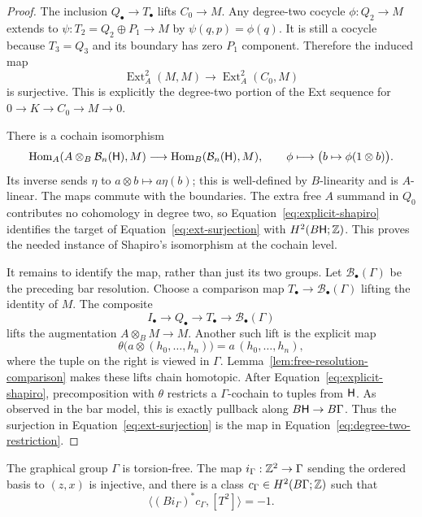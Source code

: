 \begin{proof}
The inclusion $Q_\bullet\to T_\bullet$ lifts $C_0\to M$.
Any degree-two cocycle $\phi:Q_2\to M$ extends to
$\psi:T_2=Q_2\oplus P_1\to M$ by $\psi(q,p)=\phi(q)$.
It is still a cocycle because $T_3=Q_3$ and its boundary has
zero $P_1$ component.  Therefore the induced map
\begin{equation}
 \operatorname{Ext}^2_A(M,M)
 \longrightarrow\operatorname{Ext}^2_A(C_0,M)
 \label{eq:ext-surjection}
\end{equation}
is surjective.  This is explicitly the degree-two portion of
the Ext sequence for $0\to K\to C_0\to M\to0$.

There is a cochain isomorphism
\begin{equation}
 \operatorname{Hom}_A
   (A\otimes_B\mathcal B_n(\mathsf H),M)
 \longrightarrow
 \operatorname{Hom}_B(\mathcal B_n(\mathsf H),M),\qquad
 \phi\longmapsto\bigl(b\mapsto\phi(1\otimes b)\bigr).
 \label{eq:explicit-shapiro}
\end{equation}
Its inverse sends $\eta$ to $a\otimes b\mapsto a\eta(b)$;
this is well-defined by $B$-linearity and is $A$-linear.
The maps commute with the boundaries.  The extra free $A$
summand in $Q_0$ contributes no cohomology in degree two, so
Equation~\eqref{eq:explicit-shapiro} identifies the target of
Equation~\eqref{eq:ext-surjection} with $H^2(B\mathsf H;\mathbb Z)$.
This proves the needed instance of Shapiro's isomorphism at
the cochain level.

It remains to identify the map, rather than just its two groups.
Let $\mathcal B_\bullet(\Gamma)$ be the preceding bar resolution.
Choose a comparison map $T_\bullet\to\mathcal B_\bullet(\Gamma)$
lifting the identity of $M$.  The composite
\[
 I_\bullet\longrightarrow Q_\bullet\longrightarrow T_\bullet
 \longrightarrow\mathcal B_\bullet(\Gamma)
\]
lifts the augmentation $A\otimes_B M\to M$.  Another such lift
is the explicit map
\[
 \theta\bigl(a\otimes(h_0,\ldots,h_n)\bigr)
       =a\,(h_0,\ldots,h_n),
\]
where the tuple on the right is viewed in $\Gamma$.
Lemma~\ref{lem:free-resolution-comparison} makes these lifts
chain homotopic.  After Equation~\eqref{eq:explicit-shapiro},
precomposition with $\theta$ restricts a $\Gamma$-cochain to
tuples from $\mathsf H$.  As observed in the bar model, this is exactly
pullback along $B\mathsf H\to B\Gamma$.  Thus the surjection in
Equation~\eqref{eq:ext-surjection} is the map in
Equation~\eqref{eq:degree-two-restriction}.
\end{proof}

\begin{proposition}
\label{prop:torsion-detector}
The graphical group $\Gamma$ is torsion-free.  The map
$i_\Gamma:\mathbb Z^2\to\Gamma$ sending the ordered basis to $(z,x)$
is injective, and there is a class $c_\Gamma\in H^2(B\Gamma;\mathbb Z)$
such that
\begin{equation}
 \bigl\langle(Bi_\Gamma)^*c_\Gamma,[T^2]\bigr\rangle=-1.
 \label{eq:graphical-integral-detector}
\end{equation}
\end{proposition}

